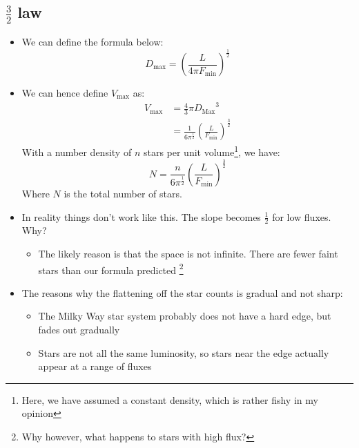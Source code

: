 \documentclass{article}
\begin{document}
\subsection{ $\frac{3}{2}$ law}
\begin{itemize}
\item We can define the formula below:
\begin{equation}
D_\text{max}=\left(\frac{L}{4 \pi F_\text{min}} \right) ^{\frac{1}{2}}
\end{equation}
\item We can hence define $V_\text{max}$ as:
\begin{align}
V_\text{max}&=\frac{4}{3} \pi {D_\text{Max}}^3 \\
&=\frac{1}{6 {\pi}^{\frac{1}{2}}} \left(\frac{L}{F_\text{min}}\right)^{\frac{3}{2}}
\end{align}
With a number density of $n$ stars per unit volume\footnote{Here, we have assumed a constant density, which is rather fishy in my opinion}, we have:
\begin{equation}
N=\frac{n}{6 {\pi}^{\frac{1}{2}}} \left(\frac{L}{F_\text{min}}\right)^{\frac{3}{2}}
\end{equation}
Where $N$ is the total number of stars.
\item In reality things don't work like this. The slope becomes $\frac{1}{2}$ for low fluxes. Why?
\begin{itemize}
\item The likely reason is that the space is not infinite. There are fewer faint stars than our formula predicted \footnote{Why however, what happens to stars with high flux?}
\end{itemize}
\item The reasons why the flattening off the star counts is gradual and not sharp:
\begin{itemize}
\item  The Milky Way star system probably does not have a hard edge, but fades out gradually
\item  Stars are not all the same luminosity, so stars near the edge actually appear at a range
of fluxes
\end{itemize}
\end{itemize}
\end{document}
